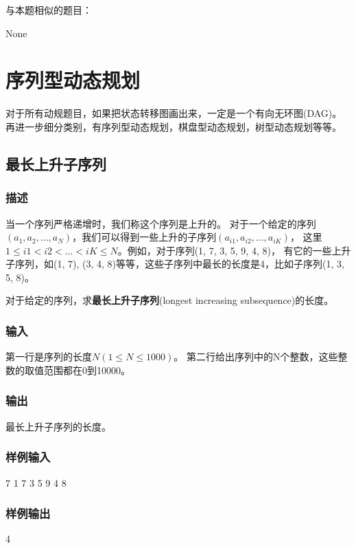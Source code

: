 与本题相似的题目：
\begindot
\item None
\myenddot


\section{序列型动态规划} %
对于所有动规题目，如果把状态转移图画出来，一定是一个有向无环图(DAG)。再进一步细分类别，有序列型动态规划，棋盘型动态规划，树型动态规划等等。


\subsection{最长上升子序列}

\subsubsection{描述}
当一个序列严格递增时，我们称这个序列是上升的。
对于一个给定的序列$(a_1, a_2, ..., a_N)$，我们可以得到一些上升的子序列$(a_{i1}, a_{i2}, ..., a_{iK})$，
这里$1 \leq i1 < i2 < ... < iK \leq N$。例如，对于序列(1, 7, 3, 5, 9, 4, 8)，
有它的一些上升子序列，如(1, 7), (3, 4, 8)等等，这些子序列中最长的长度是4，比如子序列(1, 3, 5, 8)。

对于给定的序列，求\textbf{最长上升子序列}(longest increasing subsequence)的长度。

\subsubsection{输入}
第一行是序列的长度$N (1 \leq N \leq 1000)$。
第二行给出序列中的N个整数，这些整数的取值范围都在0到10000。

\subsubsection{输出}
最长上升子序列的长度。

\subsubsection{样例输入}
\begin{Code}
7
1 7 3 5 9 4 8
\end{Code}

\subsubsection{样例输出}
\begin{Code}
4
\end{Code}

